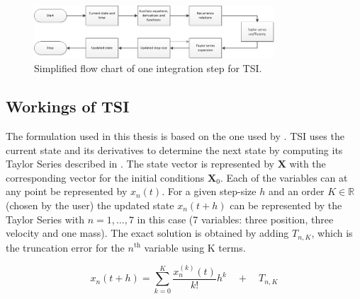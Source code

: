  \begin{figure}[H]
\centering
\includegraphics[width=0.8\textwidth]{figures/tsi/TSIintegrationStep.png}
\caption{Simplified flow chart of one integration step for \ac{TSI}.}
\label{fig:TSIintegrationStep}
\end{figure}

\subsection{Workings of \ac{TSI}}
\label{subsec:workTsi}
The formulation used in this thesis is based on the one used by \cite{scott2008high}. \ac{TSI} uses the current state and its derivatives to determine the next state by computing its Taylor Series described in . The state vector is represented by $\mathbf{X}$ with the corresponding vector for the initial conditions $\mathbf{X}_{0}$. Each of the variables can at any point be represented by $x_{n}\left(t\right)$. For a given step-size $h$ and an order $K \in \mathbb{R}$ (chosen by the user) the updated state $x_{n}\left(t+h\right)$ can be represented by the Taylor Series with $n=1,\dots,7$ in this case (7 variables: three position, three velocity and one mass). The exact solution is obtained by adding $T_{n,K}$, which is the truncation error for the $n^{\text{th}}$ variable using K terms. 






\begin{equation} \label{eq:general_taylor}
x_{n}\left(t+h\right)=\displaystyle\sum_{k=0}^{K}\dfrac{x_{n}^{\left(k\right)}\left(t\right)}{k!}h^{k} \quad + \quad	T_{n,K}
\end{equation}

